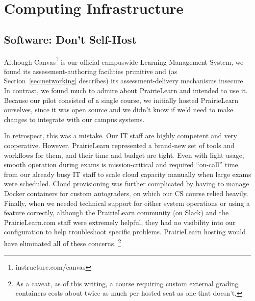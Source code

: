 \section{Computing Infrastructure}
\label{sec:it}

\subsection{Software: Don't Self-Host}
\label{sec:software}

Although 
Canvas\footnote{instructure.com/canvas} is our official
campuswide Learning Management System,
we found its assessment-authoring facilities primitive and (as
Section~\ref{sec:networking} describes) its assessment-delivery
mechanisms insecure.
In contrast, we found much to admire about 
PrairieLearn and
intended to use it.
Because our pilot consisted of a single course,
we initially hosted PrairieLearn ourselves, since it was open source
and we didn't know if we'd need to make changes to integrate with our
campus systems.

In retrospect, this was a mistake.
Our IT staff are highly competent and very cooperative.  However,
PrairieLearn represented a brand-new set of tools and
workflows for them, and their time and budget are tight.
Even with light usage, smooth operation during exams is
mission-critical and required ``on-call'' time from our already busy
IT staff to scale cloud capacity manually when large exams were scheduled.
Cloud provisioning was further complicated by having to manage Docker
containers for custom autograders, on which our CS course relied heavily.
Finally, when we needed technical support for either system operations or
using a feature correctly,
although the PrairieLearn community (on Slack) and the PrairieLearn.com staff were
extremely helpful, 
they had no visibility into our configuration to help
troubleshoot specific problems.
PrairieLearn
hosting would have eliminated all of these concerns.
\footnote{As a caveat, as of this writing, a course requiring custom
external grading containers costs about twice as much per hosted seat as one that doesn't.}

